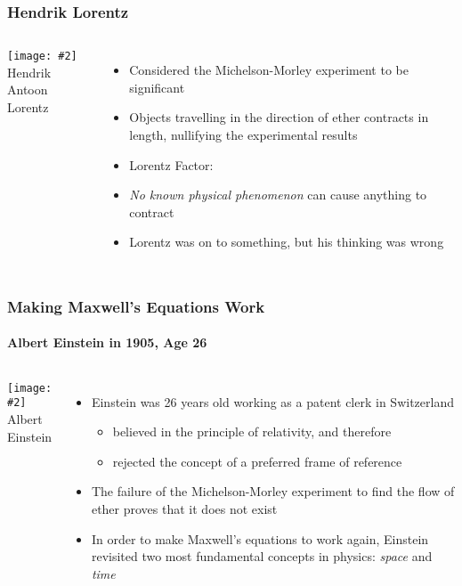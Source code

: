 \documentclass[12pt,compress,aspectratio=169]{beamer}
\newcommand{\pic}[2]{\texttt{[image: \#2]}}
\newcommand{\bigsqrt}{\ensuremath\sqrt{1-\left(\frac{v}{c}\right)^2}}
\newcommand{\lorentz}{\ensuremath\frac{1}{\bigsqrt}}
\newcommand{\eq}[2]{\vspace{#1}{\Large\begin{displaymath}#2\end{displaymath}}}
\begin{document}
\begin{frame}
  \frametitle{Hendrik Lorentz}
  \begin{columns}
    
    \begin{center}
      \pic{1.2}{graphics/lorentz.jpg}\\
      {\footnotesize Hendrik Antoon Lorentz}
    \end{center}
    
    \begin{itemize}
    \item Considered the Michelson-Morley experiment to be significant
    \item Objects travelling in the direction of ether contracts in length,
      nullifying the experimental results
    \item Lorentz Factor:
      
      \eq{-.25in}{
        \boxed{\gamma=\lorentz}
      }
    \item \emph{No known physical phenomenon} can cause anything to contract
    \item Lorentz was on to something, but his thinking was wrong
    \end{itemize}
  \end{columns}
\end{frame}

\begin{frame}
  \frametitle{Making Maxwell's Equations Work}
  \framesubtitle{Albert Einstein in 1905, Age 26}
  \begin{columns}
    \pic{1.1}{graphics/Einstein_patentoffice.jpg}\\
    {\footnotesize Albert Einstein}
  
    \begin{itemize}
    \item Einstein was 26 years old working as a patent clerk in Switzerland
      \begin{itemize}
      \item believed in the principle of relativity, and therefore
      \item rejected the concept of a preferred frame of reference
      \end{itemize}
    \item The failure of the Michelson-Morley experiment to find the flow of
      ether proves that it does not exist
    \item In order to make Maxwell's equations to work again, Einstein
      revisited two most fundamental concepts in physics: \emph{space} and
      \emph{time}
    \end{itemize}
  \end{columns}
\end{frame}
\end{document}
